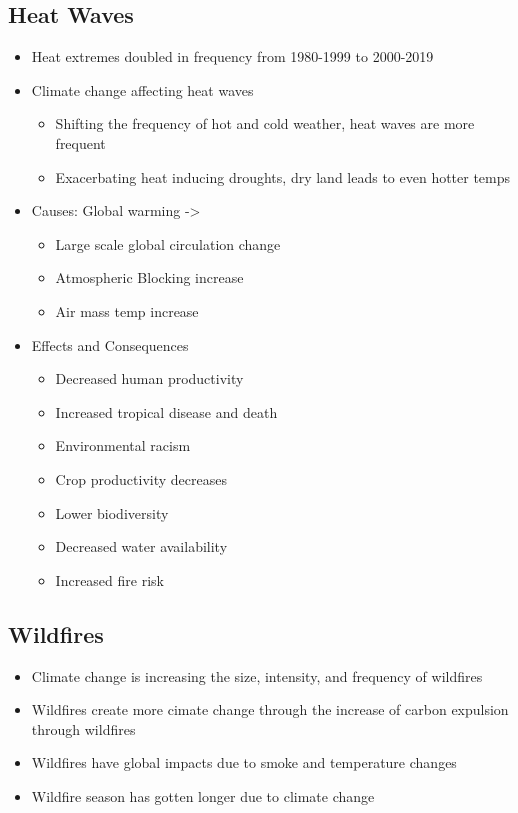 \documentclass[11pt]{article}
\begin{document}
\subsection{Heat Waves}
\label{sec:orge37e3b6}
\begin{itemize}
\item Heat extremes doubled in frequency from 1980-1999 to 2000-2019
\item Climate change affecting heat waves
\begin{itemize}
\item Shifting the frequency of hot and cold weather, heat waves are more frequent
\item Exacerbating heat inducing droughts, dry land leads to even hotter temps
\end{itemize}
\item Causes: Global warming ->
\begin{itemize}
\item Large scale global circulation change
\item Atmospheric Blocking increase
\item Air mass temp increase
\end{itemize}
\item Effects and Consequences
\begin{itemize}
\item Decreased human productivity
\item Increased tropical disease and death
\item Environmental racism
\item Crop productivity decreases
\item Lower biodiversity
\item Decreased water availability
\item Increased fire risk
\end{itemize}
\end{itemize}
\subsection{Wildfires}
\label{sec:org79f3acd}
\begin{itemize}
\item Climate change is increasing the size, intensity, and frequency of wildfires
\item Wildfires create more cimate change through the increase of carbon expulsion through wildfires
\item Wildfires have global impacts due to smoke and temperature changes
\item Wildfire season has gotten longer due to climate change
\end{itemize}
\end{document}
